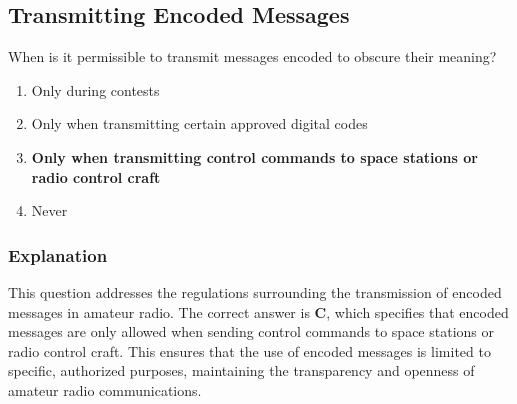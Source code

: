 \subsection{Transmitting Encoded Messages}
\label{T1D03}

\begin{tcolorbox}[colback=gray!10!white,colframe=black!75!black,title=T1D03]
When is it permissible to transmit messages encoded to obscure their meaning?
\begin{enumerate}[label=\Alph*,noitemsep]
    \item Only during contests
    \item Only when transmitting certain approved digital codes
    \item \textbf{Only when transmitting control commands to space stations or radio control craft}
    \item Never
\end{enumerate}
\end{tcolorbox}

\subsubsection*{Explanation}
This question addresses the regulations surrounding the transmission of encoded messages in amateur radio. The correct answer is \textbf{C}, which specifies that encoded messages are only allowed when sending control commands to space stations or radio control craft. This ensures that the use of encoded messages is limited to specific, authorized purposes, maintaining the transparency and openness of amateur radio communications.